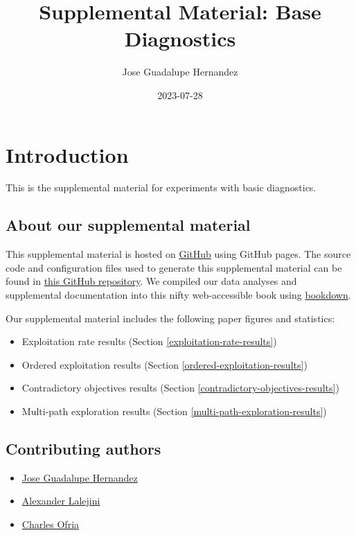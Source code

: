 \documentclass[]{book}
\title{Supplemental Material: Base Diagnostics}
\author{Jose Guadalupe Hernandez}
\date{2023-07-28}
\providecommand{\tightlist}{%
  \setlength{\itemsep}{0pt}\setlength{\parskip}{0pt}}
\begin{document}
\maketitle

{
\setcounter{tocdepth}{1}
\tableofcontents
}
\hypertarget{introduction}{%
\chapter{Introduction}\label{introduction}}

This is the supplemental material for experiments with basic diagnostics.

\hypertarget{about-our-supplemental-material}{%
\section{About our supplemental material}\label{about-our-supplemental-material}}

This supplemental material is hosted on \href{https://github.com}{GitHub} using GitHub pages.
The source code and configuration files used to generate this supplemental material can be found in \href{https://github.com/jgh9094/ECJ-2023-Suite-Of-Diagnostic-Metrics-For-Characterizing-Selection-Schemes}{this GitHub repository}.
We compiled our data analyses and supplemental documentation into this nifty web-accessible book using \href{https://bookdown.org/}{bookdown}.

Our supplemental material includes the following paper figures and statistics:

\begin{itemize}
\tightlist
\item
  Exploitation rate results (Section \ref{exploitation-rate-results})
\item
  Ordered exploitation results (Section \ref{ordered-exploitation-results})
\item
  Contradictory objectives results (Section \ref{contradictory-objectives-results})
\item
  Multi-path exploration results (Section \ref{multi-path-exploration-results})
\end{itemize}

\hypertarget{contributing-authors}{%
\section{Contributing authors}\label{contributing-authors}}

\begin{itemize}
\tightlist
\item
  \href{https://jgh9094.github.io/}{Jose Guadalupe Hernandez}
\item
  \href{https://lalejini.com}{Alexander Lalejini}
\item
  \href{http://ofria.com}{Charles Ofria}
\end{itemize}
\end{document}
